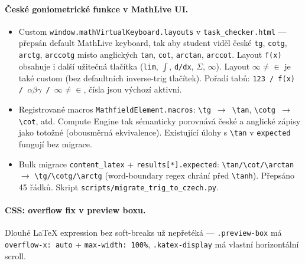 \documentclass[11pt,a4paper]{article}
\begin{document}
\paragraph{České goniometrické funkce v MathLive UI.}
\begin{itemize}
  \item Custom \texttt{window.mathVirtualKeyboard.layouts} v \texttt{task\_checker.html} --- přepsán default MathLive keyboard, tak aby student viděl české \texttt{tg}, \texttt{cotg}, \texttt{arctg}, \texttt{arccotg} místo anglických \texttt{tan}, \texttt{cot}, \texttt{arctan}, \texttt{arccot}. Layout \texttt{f(x)} obsahuje i další užitečná tlačítka (\texttt{lim}, \texttt{$\int$}, \texttt{d/dx}, \texttt{$\Sigma$}, \texttt{$\infty$}). Layout \texttt{$\infty\neq\in$} je také custom (bez defaultních inverse-trig tlačítek). Pořadí tabů: \texttt{123 / f(x) / $\alpha\beta\gamma$ / $\infty\neq\in$}, čísla jsou výchozí aktivní.
  \item Registrované macros \texttt{MathfieldElement.macros}: \texttt{\textbackslash tg $\rightarrow$ \textbackslash tan}, \texttt{\textbackslash cotg $\rightarrow$ \textbackslash cot}, atd. Compute Engine tak sémanticky porovnává české a anglické zápisy jako totožné (obousměrná ekvivalence). Existující úlohy s \texttt{\textbackslash tan} v \texttt{expected} fungují bez migrace.
  \item Bulk migrace \texttt{content\_latex} + \texttt{results[*].expected}: \texttt{\textbackslash tan/\textbackslash cot/\textbackslash arctan} $\rightarrow$ \texttt{\textbackslash tg/\textbackslash cotg/\textbackslash arctg} (word-boundary regex chrání před \texttt{\textbackslash tanh}). Přepsáno 45 řádků. Skript \texttt{scripts/migrate\_trig\_to\_czech.py}.
\end{itemize}

\paragraph{CSS: overflow fix v preview boxu.} Dlouhé LaTeX expression bez soft-breaks už nepřetéká --- \texttt{.preview-box} má \texttt{overflow-x: auto} + \texttt{max-width: 100\%}, \texttt{.katex-display} má vlastní horizontální scroll.
\end{document}
